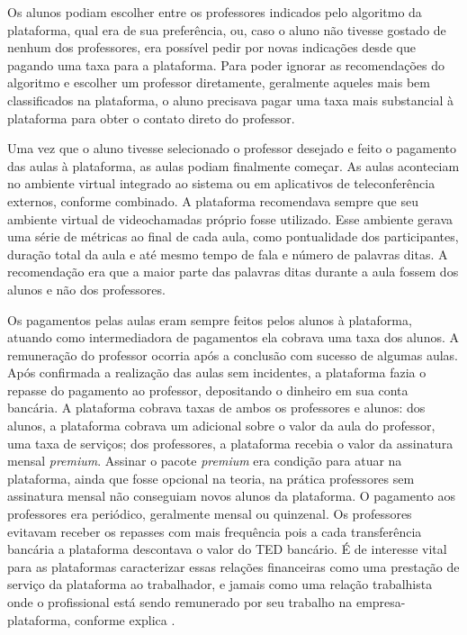 \documentclass[portuguese]{textolivre}
\begin{document}
Os alunos podiam escolher entre os professores indicados pelo algoritmo da plataforma, qual era de sua preferência, ou, caso o aluno não tivesse gostado de nenhum dos professores, era possível pedir por novas indicações desde que pagando uma taxa para a plataforma. Para poder ignorar as recomendações do algoritmo e escolher um professor diretamente, geralmente aqueles mais bem classificados na plataforma, o aluno precisava pagar uma taxa mais substancial à plataforma para obter o contato direto do professor.

Uma vez que o aluno tivesse selecionado o professor desejado e feito o pagamento das aulas à plataforma, as aulas podiam finalmente começar. As aulas aconteciam no ambiente virtual integrado ao sistema ou em aplicativos de teleconferência externos, conforme combinado. A plataforma recomendava sempre que seu ambiente virtual de videochamadas próprio fosse utilizado. Esse ambiente gerava uma série de métricas ao final de cada aula, como pontualidade dos participantes, duração total da aula e até mesmo tempo de fala e número de palavras ditas. A recomendação era que a maior parte das palavras ditas durante a aula fossem dos alunos e não dos professores.

Os pagamentos pelas aulas eram sempre feitos pelos alunos à plataforma, atuando como intermediadora de pagamentos ela cobrava uma taxa dos alunos. A remuneração do professor ocorria após a conclusão com sucesso de algumas aulas. Após confirmada a realização das aulas sem incidentes, a plataforma fazia o repasse do pagamento ao professor, depositando o dinheiro em sua conta bancária. A plataforma cobrava taxas de ambos os professores e alunos: dos alunos, a plataforma cobrava um adicional sobre o valor da aula do professor, uma taxa de serviços; dos professores, a plataforma recebia o valor da assinatura mensal \textit{premium}. Assinar o pacote \textit{premium} era condição para atuar na plataforma, ainda que fosse opcional na teoria, na prática professores sem assinatura mensal não conseguiam novos alunos da plataforma. O pagamento aos professores era periódico, geralmente mensal ou quinzenal. Os professores evitavam receber os repasses com mais frequência pois a cada transferência bancária a plataforma descontava o valor do TED bancário. É de interesse vital para as plataformas caracterizar essas relações financeiras como uma prestação de serviço da plataforma ao trabalhador, e jamais como uma relação trabalhista onde o profissional está sendo remunerado por seu trabalho na empresa-plataforma, conforme explica \textcite{abilio2020}.
\end{document}

